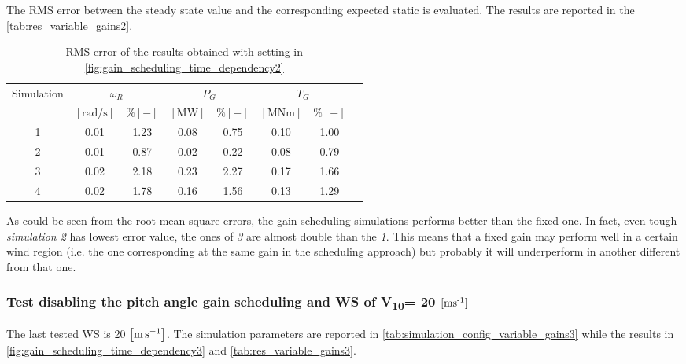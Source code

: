 The \acrshort{RMS} error between the steady state value and the corresponding expected static is evaluated. The results are reported in the \autoref{tab:res_variable_gains2}.
\begin{table}[htb]
  \caption{RMS error of the results obtained with setting in \autoref{fig:gain_scheduling_time_dependency2}}
  \centering
  \begin{tabular}{cccccccc}
    \toprule
      Simulation & \multicolumn{2}{c}{$\omega_R$} & \multicolumn{2}{c}{$P_G$} & \multicolumn{2}{c}{$T_G$} \\ 
       & $\left[\si{\radian\per\second}\right]$ & $ \% \left[-\right]$ & $\left[\si{\mega\watt}\right]$ & $ \% \left[-\right]$ & $\left[\si{\mega\newton\meter} \right]$ & $ \% \left[-\right]$ \\ \midrule      
     1 & 0.01 &  1.23 &  0.08  &  0.75  &  0.10  &  1.00 \\
     2 & 0.01 &  0.87 &  0.02  &  0.22  &  0.08  &  0.79 \\
     3 & 0.02 &  2.18 &  0.23  &  2.27  &  0.17  &  1.66 \\
     4 & 0.02 &  1.78 &  0.16  &  1.56  &  0.13  &  1.29 \\
    
     \bottomrule
  \end{tabular}
  \label{tab:res_variable_gains2}
\end{table}

As could be seen from the root mean square errors, the gain scheduling simulations performs better than the fixed one. In fact, even tough \textit{simulation 2} has lowest error value, the ones of \textit{3} are almost double than the \textit{1}. This means that a fixed gain may perform well in a certain wind region (i.e. the one corresponding at the same gain in the scheduling approach) but probably it will underperform in another different from that one.  

\subsubsection[$V_{10}=20 \, \mesunt{\meter\per\second}$]{Test disabling the pitch angle gain scheduling and WS of V\textsubscript{10}= 20 $\left[ \text{ms}\textsuperscript{-1} \right]$}
The last tested \acrshort{WS} is 20 $\left[\si{\meter\per\second}\right]$. The simulation parameters are reported in \autoref{tab:simulation_config_variable_gains3} while the results in \autoref{fig:gain_scheduling_time_dependency3} and \autoref{tab:res_variable_gains3}.

